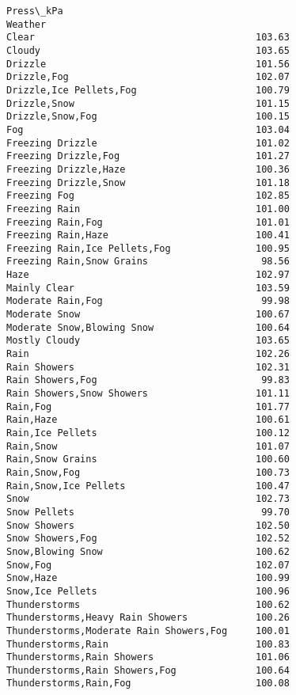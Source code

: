 \documentclass[11pt]{article}
\begin{document}
\begin{tcolorbox}[breakable, size=fbox, boxrule=.5pt, pad at break*=1mm, opacityfill=0]
\begin{Verbatim}[commandchars=\\\{\}]
                                         Press\_kPa
Weather
Clear                                       103.63
Cloudy                                      103.65
Drizzle                                     101.56
Drizzle,Fog                                 102.07
Drizzle,Ice Pellets,Fog                     100.79
Drizzle,Snow                                101.15
Drizzle,Snow,Fog                            100.15
Fog                                         103.04
Freezing Drizzle                            101.02
Freezing Drizzle,Fog                        101.27
Freezing Drizzle,Haze                       100.36
Freezing Drizzle,Snow                       101.18
Freezing Fog                                102.85
Freezing Rain                               101.00
Freezing Rain,Fog                           101.01
Freezing Rain,Haze                          100.41
Freezing Rain,Ice Pellets,Fog               100.95
Freezing Rain,Snow Grains                    98.56
Haze                                        102.97
Mainly Clear                                103.59
Moderate Rain,Fog                            99.98
Moderate Snow                               100.67
Moderate Snow,Blowing Snow                  100.64
Mostly Cloudy                               103.65
Rain                                        102.26
Rain Showers                                102.31
Rain Showers,Fog                             99.83
Rain Showers,Snow Showers                   101.11
Rain,Fog                                    101.77
Rain,Haze                                   100.61
Rain,Ice Pellets                            100.12
Rain,Snow                                   101.07
Rain,Snow Grains                            100.60
Rain,Snow,Fog                               100.73
Rain,Snow,Ice Pellets                       100.47
Snow                                        102.73
Snow Pellets                                 99.70
Snow Showers                                102.50
Snow Showers,Fog                            102.52
Snow,Blowing Snow                           100.62
Snow,Fog                                    102.07
Snow,Haze                                   100.99
Snow,Ice Pellets                            100.96
Thunderstorms                               100.62
Thunderstorms,Heavy Rain Showers            100.26
Thunderstorms,Moderate Rain Showers,Fog     100.01
Thunderstorms,Rain                          100.83
Thunderstorms,Rain Showers                  101.06
Thunderstorms,Rain Showers,Fog              100.64
Thunderstorms,Rain,Fog                      100.08
\end{Verbatim}
\end{tcolorbox}
        
\end{document}
